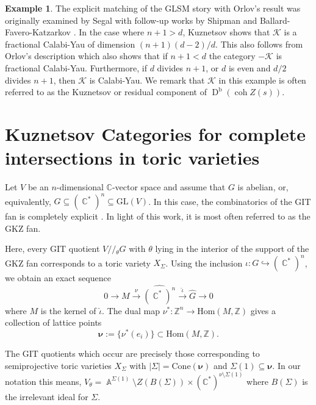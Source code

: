\documentclass[reqno, 12pt]{amsart}
\theoremstyle{definition}
\newtheorem{example}[theorem]{Example}
\newcommand{\op}[1]{\operatorname{#1}}
\newcommand{\modmod}[1]{/ \! \! / \!_{#1}}
\newcommand{\dbcoh}[1]{\operatorname{D}^{\operatorname{b}}(\operatorname{coh }#1)}
\newcommand{\Hom}{\text{Hom}}
\def\C{\op{\mathbb{C}}}
\def\A{\op{\mathbb{A}}}
\def\n{n}
\numberwithin{equation}{section}
\begin{document}
\begin{example}
The explicit matching of the GLSM story with Orlov's result was originally examined by Segal \cite{Segal} with follow-up works by Shipman \cite{Shipman} and Ballard-Favero-Katzarkov \cite{VGIT}. In the case where $n+1 > d$, Kuznetsov \cite[Corollary 4.4]{Kuz05} shows that $\mathcal{K}$ is a fractional Calabi-Yau of dimension $(n+1)(d-2)/d$. This also follows from Orlov's description \cite{Orlov} which also shows that if $n+1 < d$ the category $-\mathcal K$ is fractional Calabi-Yau.  Furthermore, if $d$ divides $n+1$, or $d$ is even and $d/2$ divides $n+1$, then $\mathcal{K}$ is Calabi-Yau. We remark that $\mathcal K$ in this example is often referred to as the Kuznetsov or residual component of $\dbcoh{Z(s)}$.
\end{example}


 \section{Kuznetsov Categories for complete intersections in toric varieties}\label{sec:toric complete intersections}

Let $V$ be an $n$-dimensional $\mathbb C$-vector space and assume that $G$ is abelian, or, equivalently, $G \subseteq (\C^*)^{\n} \subseteq \text{GL}(V)$.
In this case, the combinatorics of the GIT fan is completely explicit \cite{GKZ}.  In light of this work, it is most often referred to as the GKZ fan. %

Here, every GIT quotient $V\modmod{\theta} G$ with $\theta$ lying in the interior of the support of the GKZ fan corresponds to a toric variety  $X_\Sigma$. Using the inclusion $\iota: G \hookrightarrow (\C^*)^{\n}$, we obtain an exact sequence 
\begin{equation}\label{ses: GIT}
0 \to M \xrightarrow{\nu} \widehat{(\C^*)^{\n}} \xrightarrow{\hat\iota} \widehat G \to 0
\end{equation}
where $M$ is the kernel of $\hat \iota$.  The dual map $\nu^*: \mathbb Z^{\n} \to \Hom(M, \mathbb Z)$ gives a collection of lattice points
\[
\boldsymbol{\nu} :=\{ \nu^*(e_i) \} \subset \Hom(M, \mathbb Z).
\]

The GIT quotients which occur are precisely those corresponding to semiprojective toric varieties $X_\Sigma$ with $|\Sigma| = \text{Cone}(\boldsymbol{\nu})$ and $\Sigma(1) \subseteq \boldsymbol{\nu}$.  In our notation this means, $V_{\theta} = \A^{\Sigma(1)} \setminus Z(B(\Sigma)) \times (\mathbb C^*)^{\nu \setminus \Sigma(1) }$ where $B(\Sigma)$ is the irrelevant ideal for $\Sigma$.
\end{document}
